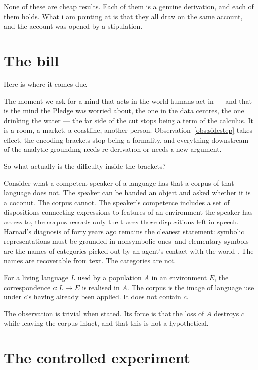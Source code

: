 None of these are cheap results.
Each of them is a genuine derivation, and each of them holds.
What i am pointing at is that they all draw on the same account,
and the account was opened by a stipulation.

\section{The bill}
\label{sec:the-bill}

Here is where it comes due.

The moment we ask for a mind that acts in the world humans act in
--- and that is the mind the Pledge was worried about, the one in
the data centres, the one drinking the water --- the far side of
the cut stops being a term of the calculus.
It is a room, a market, a coastline, another person.
Observation~\ref{obs:sidestep} takes effect, the encoding brackets
stop being a formality, and everything downstream of the analytic
grounding needs re-derivation or needs a new argument.

So what actually is the difficulty inside the brackets?

Consider what a competent speaker of a language has that a corpus
of that language does not.
The speaker can be handed an object and asked whether it is a
coconut.
The corpus cannot.
The speaker's competence includes a set of dispositions connecting
expressions to features of an environment the speaker has access
to; the corpus records only the traces those dispositions left in
speech.
Harnad's diagnosis of forty years ago remains the cleanest
statement: symbolic representations must be grounded in nonsymbolic
ones, and elementary symbols are the names of categories picked out
by an agent's contact with the world \cite{harnad1990}.
The names are recoverable from text.
The categories are not.

\begin{observation}
\label{obs:locus}
For a living language $L$ used by a population $A$ in an
environment $E$, the correspondence $c : L \to E$ is realised in
$A$.
The corpus is the image of language use under $c$'s having already
been applied.
It does not contain $c$.
\end{observation}

\noindent
The observation is trivial when stated.
Its force is that the loss of $A$ destroys $c$ while leaving the
corpus intact, and that this is not a hypothetical.

\section{The controlled experiment}
\label{sec:decipherment}

